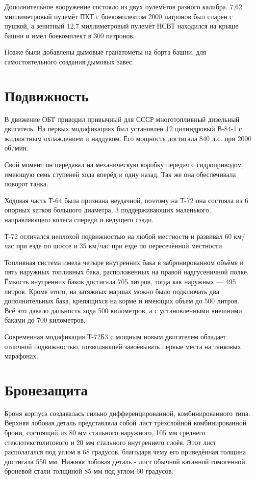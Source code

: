 Дополнительное вооружение состояло из двух пулемётов разного калибра. 7,62 миллиметровый пулемёт ПКТ с боекомплектом 2000 патронов был спарен с пушкой, а зенитный 12,7 миллиметровый пулемёт НСВТ находился на крыше башни и имел боекомплект в 300 патронов.

Позже были добавлены дымовые гранатомёты на борта башни, для самостоятельного создания дымовых завес.


\section{Подвижность}

	В движение ОБТ приводил привычный для СССР многотопливный дизельный двигатель. На первых модификациях был установлен 12 цилиндровый В-84-1 с жидкостным охлаждением и наддувом. Его мощность достигала 840 л.с. при 2000 об/мин.

Свой момент он передавал на механическую коробку передач с гидроприводом, имеющую семь ступеней хода вперёд и одну назад. Так же она обеспечивала поворот танка.

Ходовая часть Т-64 была признана неудачной, поэтому на Т-72 она состояла из 6 опорных катков большого диаметра, 3 поддерживающих маленького, направляющего колеса спереди и ведущего сзади.

Т-72 отличался неплохой подвижностью на любой местности и развивал 60 км/час при езде по шоссе и 35 км/час при езде по пересечённой местности.

Топливная система имела четыре внутренних бака в забронированном объёме и пять наружных топливных бака, расположенных на правой надгусеничной полке. Ёмкость внутренних баков достигала 705 литров, тогда как наружных — 495 литров. Кроме этого, на затяжных маршах можно было подключать два дополнительных бака, крепящихся на корме и имеющих объем до 500 литров. Всё это давало дальность хода 500 километров, а с установленными внешними баками до 700 километров.

Современная модификация Т-72Б3 с мощным новым двигателем обладает отличной подвижностью, позволяющей завоёвывать первые места на танковых марафонах.

\section{Бронезащита}
	Броня корпуса создавалась сильно дифференцированной, комбинированного типа. Верхняя лобовая деталь представляла собой лист трёхслойной комбинированной брони, состоящий из 80 мм стального наружного, 105 мм среднего стеклотекстолитового и 20 мм стального внутреннего слоёв. Этот лист располагался под углом в 68 градусов, благодаря чему его приведённая толщина достигала 550 мм. Нижняя лобовая деталь - лист обычной катанной гомогенной броневой стали толщиной 85 мм под углом 60 градусов.

